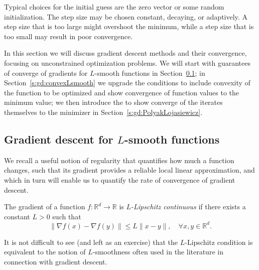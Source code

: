 Typical choices for the initial guess are the zero vector or some random initialization.
The step size may be chosen constant, decaying, or adaptively. A step size that is too large might overshoot the minimum, while a step size that is too small may result
in poor convergence.

In this section we will discuss gradient descent methods and their convergence, focusing on unconstrained optimization problems. We will start with guarantees of converge of gradients for $L$-smooth functions in Section~\ref{s:gd:Lsmoothfunctions}; in Section~\ref{s:gd:convexLsmooth} we upgrade the conditions to include convexity of the function to be optimized and show convergence of function values to the minimum value; we then introduce the  \PLC to show converge of the iterates themselves to the minimizer in Section~\ref{s:gd:PolyakLojasiewicz}. 


\subsection{Gradient descent for $L$-smooth functions}\label{s:gd:Lsmoothfunctions}




We recall a useful notion of regularity that quantifies how much a function changes, such that its gradient 
provides a reliable local linear approximation, and which in turn will enable us to quantify the rate of convergence of gradient descent.

\begin{definition}\label{Lipschitz}
    The gradient of a function $f : \mathbb{R}^d \to \mathbb{R}$ is {\em $L$-Lipschitz continuous}  if there exists a constant $L > 0$ such that
\begin{equation}
    \label{def:Lipschitz}
\|\nabla f(x) - \nabla f(y)\| \le L \|x - y\|, \quad \forall x,y \in \mathbb{R}^d.
\end{equation}
\end{definition}


It is not difficult to see (and left as an exercise) that the $L$-Lipschitz condition is equivalent to the notion of $L$-smoothness often used in the literature in connection with gradient descent.

